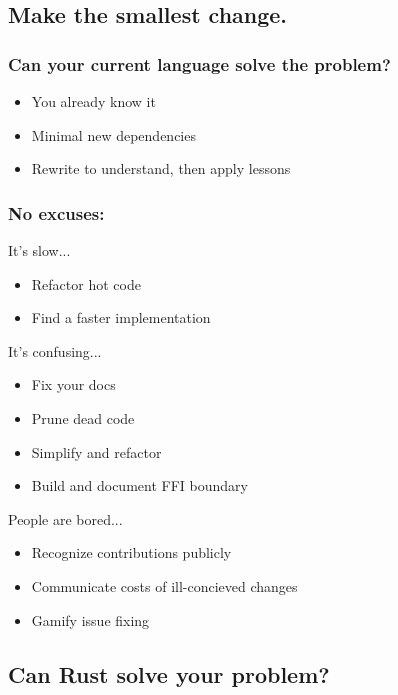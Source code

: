 \documentclass{beamer}
\begin{document}
\subsection{Make the smallest change.}

\begin{frame}[fragile]
\tableofcontents[currentsubsection]
\end{frame}


\begin{frame}[fragile]
\frametitle{Can your current language solve the problem?}
\begin{itemize}[<+(1)->]
\item You already know it
\item Minimal new dependencies
\item Rewrite to understand, then apply lessons
\end{itemize}
\end{frame}


\begin{frame}[fragile]
\frametitle{No excuses:}
It's slow...
\begin{itemize}[<+(1)->]
\item Refactor hot code
\item Find a faster implementation
\end{itemize}
It's confusing...
\begin{itemize}[<+(1)->]
\item Fix your docs
\item Prune dead code
\item Simplify and refactor
\item Build and document FFI boundary
\end{itemize}
People are bored...
\begin{itemize}[<+(1)->]
\item Recognize contributions publicly
\item Communicate costs of ill-concieved changes
\item Gamify issue fixing
\end{itemize}
\end{frame}

\subsection{Can Rust solve your problem?}

\begin{frame}[fragile]
\tableofcontents[currentsubsection]
\end{frame}
\end{document}
